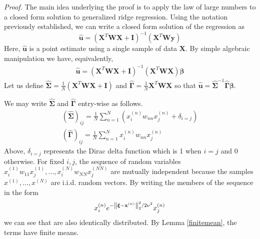 \documentclass[mnsc,blindrev]{informs3}
\newcommand{\bx}{\mathbf{x}}
\newcommand{\bu}{\mathbf{u}}
\newcommand{\by}{\mathbf{y}}
\newcommand{\bX}{\mathbf{X}}
\newcommand{\bI}{\mathbf{I}}
\newcommand{\bW}{\mathbf{W}}
\newcommand{\bxi}{\boldsymbol{\xi}}
\newcommand{\bS}{\boldsymbol{\Sigma}}
\newcommand{\bG}{\boldsymbol{\Gamma}}
\begin{document}
\noindent \emph{Proof.}
    The main idea underlying the proof is to apply the law of large numbers to a closed form solution to generalized ridge regression. Using the notation previously established, we can write a closed form solution of the regression as
    \begin{equation}
        \label{eq:closed_form}
        \hat{\bu} = (\bX^T \bW \bX + \bI)^{-1}(\bX^T \bW \by)
    \end{equation}
    Here, $\hat{\bu}$ is a point estimate using a single sample of data $\bX$. By simple algebraic manipulation we have, equivalently, 
    \begin{gather*}
         \hat{\bu} =  (\bX^T \bW \bX + \bI)^{-1}(\bX^T \bW \bX) \boldsymbol{\beta}
    \end{gather*}
    Let us define $\hat{\bS} = \frac{1}{N}(\bX^T \bW \bX + \bI) $ and $\hat{\bG} = \frac{1}{N}\bX^T \bW \bX$ so that $\hat{\bu} = \hat{\bS}^{-1}\hat{\bG}\boldsymbol{\beta}$.
    
    We may write $\hat{\bS}$ and $\hat{\bG}$ entry-wise as follows.
    \begin{gather*}
        (\hat{\bS})_{ij} = \frac{1}{N}\sum_{n=1}^N( x_i^{(n)} w_{nn} x_j^{(n)} + \delta_{i=j}) \\
        (\hat{\bG})_{ij} = \frac{1}{N} \sum_{n=1}^N x_i^{(n)} w_{nn} x_j^{(n)} 
    \end{gather*}
    Above, $\delta_{i=j}$ represents the Dirac delta function which is 1 when $i=j$ and 0 otherwise. For fixed $i,j$, the sequence of random variables $x_i^{(1)} w_{11} x_j^{(1)},\ldots,x_i^{(N)} w_{NN} x_j^{(NN)}$ are mutually independent because the samples $x^{(1)},\ldots,x^{(N)}$ are i.i.d. random vectors. 
    By writing the members of the sequence in the form
    \begin{equation*}   
        x_i^{(n)} e^{-\norm{\bxi - \bx^{(n)}}_2^2/2\nu^2} x_j^{(n)}
    \end{equation*}
    we can see that are also identically distributed. %
    By Lemma \ref{finitemean}, the terms have finite means. 
    
\end{document}
